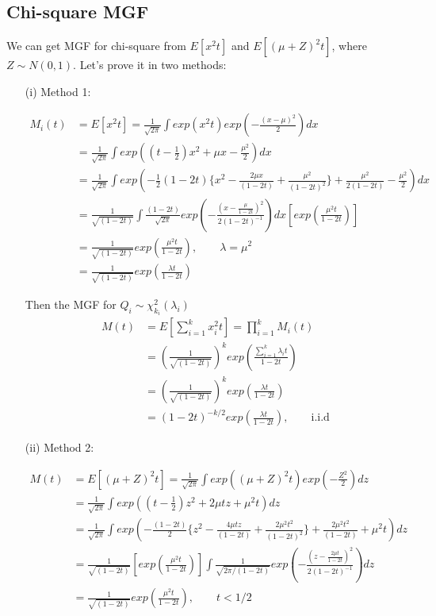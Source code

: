 \subsection{Chi-square MGF}
We can get MGF for chi-square from $E[x^2 t]$ and $E[(\mu + Z)^2 t]$, where $Z \sim N(0,1)$.
Let's prove it in two methods:
\begin{itemize}
	\item [(i)] Method 1:
	
	\begin{align*}
		M_i(t) &= E[x^2 t] = \frac{1}{\sqrt{2\pi}} \int exp(x^2 t) exp \left( - \frac{(x-\mu)^2}{2} \right) dx\\
		&=  \frac{1}{\sqrt{2\pi}}  \int exp \left( (t- \frac{1}{2}) x^2 + \mu x -\frac{\mu^2}{2} \right) dx \\
		&=  \frac{1}{\sqrt{2\pi}}  \int exp \left(  -\frac{1}{2}(1-2t) \{ x^2 - \frac{2 \mu x}{(1-2t)} + \frac{\mu^2}{(1-2t)^2} \} + \frac{\mu^2}{2(1-2t)} -\frac{\mu^2}{2}  \right) dx \\
		&= \frac{1}{\sqrt{(1-2t)}} \int \frac{(1-2t)}{\sqrt{2\pi}} exp\left( -\frac{(x-\frac{\mu}{1-2t})^2}{2 (1-2t)^{-1}} \right) dx \left[exp \left( \frac{\mu^2 t}{1-2t} \right) \right]\\
		&=\frac{1}{\sqrt{(1-2t)}} exp \left( \frac{\mu^2 t}{1-2t} \right), \qquad \lambda = \mu^2\\
		&=\frac{1}{\sqrt{(1-2t)}} exp \left( \frac{\lambda t}{1-2t} \right)
	\end{align*}
	
	Then the MGF for $Q_i \sim \chi^2 _{k_i}(\lambda_i)$
	\begin{align*}
		M(t) &= E[ \sum_{i=1}^k x_i^2 t] = \prod_{i=1}^k M_i(t) \\
		&=\left(\frac{1}{\sqrt{(1-2t)}} \right)^k exp \left( \frac{ \sum_{i=1}^k \lambda_i t }{1-2t} \right)\\
		&=\left(\frac{1}{\sqrt{(1-2t)}} \right)^k exp \left( \frac{ \lambda t }{1-2t} \right)\\
		&= (1-2t)^{-k/2} exp \left( \frac{ \lambda t }{1-2t} \right), \qquad \text{i.i.d}
	\end{align*}
	
	\item[(ii)] Method 2:
	
	\begin{align*}
	M(t) &= E[(\mu + Z)^2 t] = \frac{1}{\sqrt{2\pi}} \int exp \left((\mu + Z)^2 t \right) exp \left( - \frac{Z^2}{2} \right) dz\\
	&=  \frac{1}{\sqrt{2\pi}}  \int exp \left( (t- \frac{1}{2}) z^2 + 2\mu t z + \mu^2 t \right) dz \\
	&=  \frac{1}{\sqrt{2\pi}}  \int exp \left(  -\frac{(1-2t)}{2} \{ z^2 - \frac{4 \mu t z}{(1-2t)} + \frac{2 \mu^2 t^2}{(1-2t)^2} \} + \frac{2 \mu^2 t^2}{(1-2t)} + \mu^2 t   \right) dz \\
	&= \frac{1}{\sqrt{(1-2t)}} \left[exp \left( \frac{\mu^2 t}{1-2t} \right) \right] \int \frac{1}{\sqrt{2\pi/(1-2t)}} exp\left( -\frac{(z-\frac{2 \mu t}{1-2t})^2}{2 (1-2t)^{-1}} \right) dz \\
	&=\frac{1}{\sqrt{(1-2t)}} exp \left( \frac{\mu^2 t}{1-2t} \right), \qquad t<1/2
\end{align*}



\end{itemize}
